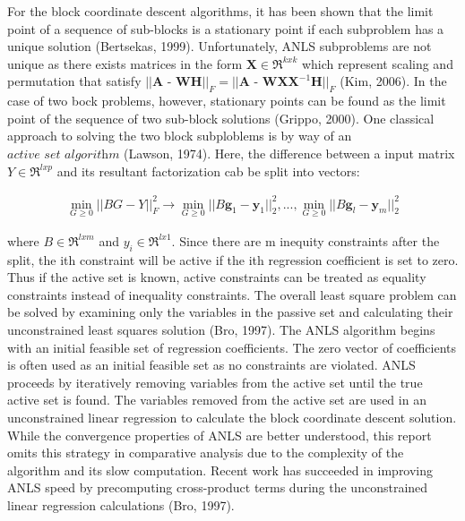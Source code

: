 \documentclass[final,leqno,onefignum,onetabnum]{siamltex1213}
\begin{document}
For the block coordinate descent algorithms, it has been shown that the limit point of a sequence of sub-blocks is a stationary point if each subproblem has a unique solution (Bertsekas, 1999). Unfortunately, ANLS subproblems are not unique as there exists matrices in the form $ \textbf{X} \in \Re^{kxk} $ which represent scaling and permutation that satisfy $ || \textbf{A - WH} ||_{F} = || \textbf{A - WXX}^{-1} \textbf{H} ||_{F} $ (Kim, 2006).  In the case of two bock problems, however, stationary points can be found as the limit point of the sequence of two sub-block solutions (Grippo, 2000). One classical approach to solving the two block subploblems is by way of an $\textit{active set algorithm}$ (Lawson, 1974). Here, the difference between a input matrix $ Y \in \Re^{lxp}$  and its resultant factorization cab be split into vectors:

\begin{equation}
\begin{align} 
    \min_{G \ge 0} || BG-Y ||^{2}_{F} \to  \min_{G \ge 0} || B\textbf{g}_1-\textbf{y}_1 ||^{2}_{2}, ...,   \min_{G \ge 0} || B\textbf{g}_l-\textbf{y}_m ||^{2}_{2}
\end{align}
\end{equation}

where $ B \in \Re^{lxm}$ and $y_i \in \Re^{lx1}$. Since there are m inequity constraints after the split, the ith constraint will be active if the ith regression coefficient is set to zero. Thus if the active set is known, active constraints can be treated as equality constraints instead of inequality constraints. The overall least square problem can be solved by examining only the variables in the passive set and calculating their unconstrained least squares solution (Bro, 1997). The ANLS algorithm begins with an initial feasible set of regression coefficients. The zero vector of coefficients is often used as an initial feasible set as no constraints are violated. ANLS proceeds by iteratively removing variables from the active set until the true active set is found. The variables removed from the active set are used in an unconstrained linear regression to calculate the block coordinate descent solution. While the convergence properties of ANLS are better understood, this report omits this strategy in comparative analysis due to the complexity of the algorithm and its slow computation. Recent work has succeeded in improving ANLS speed by precomputing cross-product terms during the unconstrained linear regression calculations (Bro, 1997). 
\end{document}
